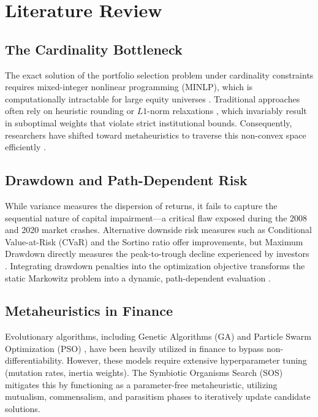 \documentclass[11pt,a4paper]{article}
\begin{document}
\section{Literature Review}

\subsection{The Cardinality Bottleneck}
The exact solution of the portfolio selection problem under cardinality constraints requires mixed-integer nonlinear programming (MINLP), which is computationally intractable for large equity universes \cite{chang2000, woodside2011}. Traditional approaches often rely on heuristic rounding or $L1$-norm relaxations \cite{fabozzi2007}, which invariably result in suboptimal weights that violate strict institutional bounds. Consequently, researchers have shifted toward metaheuristics to traverse this non-convex space efficiently \cite{maringer2005}.

\subsection{Drawdown and Path-Dependent Risk}
While variance measures the dispersion of returns, it fails to capture the sequential nature of capital impairment—a critical flaw exposed during the 2008 and 2020 market crashes. Alternative downside risk measures such as Conditional Value-at-Risk (CVaR) \cite{rockafellar2000} and the Sortino ratio \cite{sortino1994} offer improvements, but Maximum Drawdown directly measures the peak-to-trough decline experienced by investors \cite{magdon2004}. Integrating drawdown penalties into the optimization objective transforms the static Markowitz problem into a dynamic, path-dependent evaluation \cite{chekhlov2005}.

\subsection{Metaheuristics in Finance}
Evolutionary algorithms, including Genetic Algorithms (GA) \cite{holland1992} and Particle Swarm Optimization (PSO) \cite{kennedy1995, cura2009}, have been heavily utilized in finance to bypass non-differentiability. However, these models require extensive hyperparameter tuning (mutation rates, inertia weights). The Symbiotic Organisms Search (SOS) \cite{cheng2014} mitigates this by functioning as a parameter-free metaheuristic, utilizing mutualism, commensalism, and parasitism phases to iteratively update candidate solutions.
\end{document}
